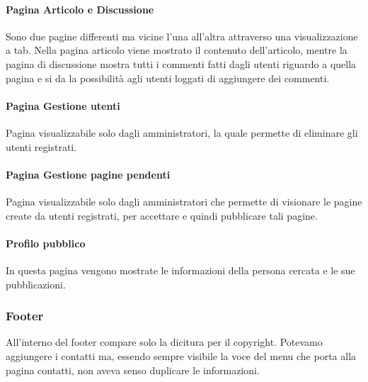 \paragraph{Pagina Articolo e Discussione} Sono due pagine differenti ma vicine l'una all'altra attraverso una visualizzazione a tab. Nella pagina articolo viene mostrato il contenuto dell'articolo, mentre la pagina di discussione mostra tutti i commenti fatti dagli utenti riguardo a quella pagina e si da la possibilità agli utenti loggati di aggiungere dei commenti.

\paragraph{Pagina Gestione utenti} Pagina visualizzabile solo dagli amministratori, la quale permette di eliminare gli utenti registrati.

\paragraph{Pagina Gestione pagine pendenti} Pagina visualizzabile solo dagli amministratori che permette di visionare le pagine create da utenti registrati, per accettare e quindi pubblicare tali pagine.

\paragraph{Profilo pubblico} In questa pagina vengono mostrate le informazioni della persona cercata e le sue pubblicazioni.

\subsubsection{Footer}
All'interno del footer compare solo la dicitura per il copyright. Potevamo aggiungere i contatti ma, essendo sempre visibile la voce del menu che porta alla pagina contatti, non aveva senso duplicare le informazioni.

\pagebreak

